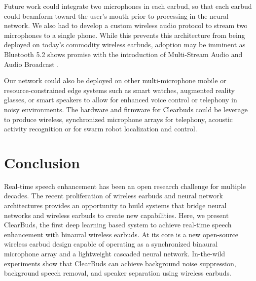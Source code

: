 \documentclass [11pt, proquest] {uwthesis}[2020/02/24]
\begin{document}
{Future work could integrate two microphones in each earbud, so that each earbud could beamform toward the user's mouth prior to processing in the neural network. We also had to develop a custom wireless audio protocol to stream two microphones to a single phone. While this prevents this architecture from being deployed on today's commodity wireless earbuds, adoption may be imminent as Bluetooth 5.2 shows promise with the introduction of Multi-Stream Audio and Audio Broadcast \cite{le-audio-faqs}.}


{ Our network could also be deployed on other multi-microphone mobile or resource-constrained edge systems such as smart watches, augmented reality glasses, or smart speakers to allow for enhanced voice control or telephony in noisy environments. The hardware and firmware for Clearbuds could be leverage to produce wireless, synchronized microphone arrays for telephony, acoustic activity recognition or for swarm robot localization and control.} 


\section{Conclusion}
Real-time speech enhancement has been an open research challenge for multiple decades. The recent proliferation of wireless earbuds and  neural network architectures provides an opportunity to build  systems that bridge neural networks and wireless earbuds to create new capabilities. Here, we present ClearBuds, the first deep learning based system to achieve real-time speech enhancement with binaural wireless earbuds. At its core is a new open-source wireless earbud design capable of operating as a synchronized binaural microphone array and a lightweight cascaded neural network. In-the-wild  experiments show that ClearBuds can achieve background noise suppression, background speech removal, and speaker separation using wireless earbuds. 





 
 
 

\end{document}
